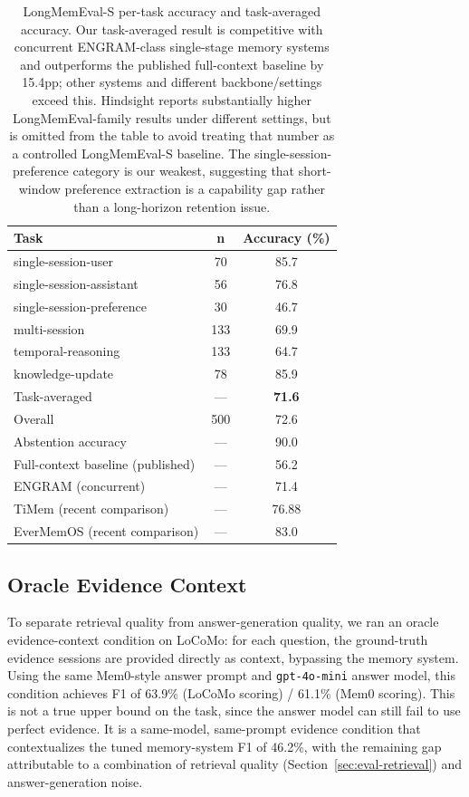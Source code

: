 \documentclass[11pt,a4paper]{article}
\begin{document}
\begin{table}[htbp]
\centering
\small
\begin{tabular}{@{}lcc@{}}
\toprule
\textbf{Task} & \textbf{n} & \textbf{Accuracy (\%)} \\
\midrule
single-session-user & 70 & 85.7 \\
single-session-assistant & 56 & 76.8 \\
single-session-preference & 30 & 46.7 \\
multi-session & 133 & 69.9 \\
temporal-reasoning & 133 & 64.7 \\
knowledge-update & 78 & 85.9 \\
\midrule
Task-averaged & --- & \textbf{71.6} \\
Overall & 500 & 72.6 \\
Abstention accuracy & --- & 90.0 \\
\midrule
Full-context baseline (published) & --- & 56.2 \\
ENGRAM \citep{patel2025engram} (concurrent) & --- & 71.4 \\
TiMem \citep{li2026timem} (recent comparison) & --- & 76.88 \\
EverMemOS \citep{hu2026evermemos} (recent comparison) & --- & 83.0 \\
\bottomrule
\end{tabular}
\caption{LongMemEval-S per-task accuracy and task-averaged accuracy. Our task-averaged result is competitive with concurrent ENGRAM-class single-stage memory systems and outperforms the published full-context baseline by 15.4pp; other systems and different backbone/settings exceed this. Hindsight reports substantially higher LongMemEval-family results under different settings, but is omitted from the table to avoid treating that number as a controlled LongMemEval-S baseline. The single-session-preference category is our weakest, suggesting that short-window preference extraction is a capability gap rather than a long-horizon retention issue.}
\label{tab:lme}
\end{table}

\subsection{Oracle Evidence Context}
\label{sec:eval-oracle}

To separate retrieval quality from answer-generation quality, we ran an oracle evidence-context condition on LoCoMo: for each question, the ground-truth evidence sessions are provided directly as context, bypassing the memory system. Using the same Mem0-style answer prompt and \texttt{gpt-4o-mini} answer model, this condition achieves F1 of 63.9\% (LoCoMo scoring) / 61.1\% (Mem0 scoring). This is not a true upper bound on the task, since the answer model can still fail to use perfect evidence. It is a same-model, same-prompt evidence condition that contextualizes the tuned memory-system F1 of 46.2\%, with the remaining gap attributable to a combination of retrieval quality (Section~\ref{sec:eval-retrieval}) and answer-generation noise.
\end{document}
